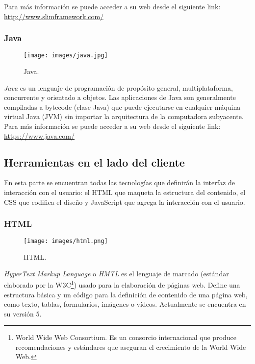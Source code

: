 Para más información se puede acceder a su web desde el siguiente link:\\ \url{http://www.slimframework.com/}

\subsubsection*{Java}
\begin{figure}[H]
	\centering
	\texttt{[image: images/java.jpg]}
	\caption{Java.}
\end{figure}
\textit{Java} es un lenguaje de programación de propósito general, multiplataforma, concurrente y orientado a objetos. Las aplicaciones de Java son generalmente compiladas a bytecode (clase Java) que puede ejecutarse en cualquier máquina virtual Java (JVM) sin importar la arquitectura de la computadora subyacente. \\  

Para más información se puede acceder a su web desde el siguiente link:\\ \url{https://www.java.com/}

\subsection{Herramientas en el lado del cliente}
En esta parte se encuentran todas las tecnologías que definirán la interfaz de interacción con el usuario: el HTML que maqueta la estructura del contenido, el CSS que codifica el diseño y JavaScript que agrega la interacción con el usuario. 
 
\subsubsection*{HTML}
\begin{figure}[H]
	\centering
	\texttt{[image: images/html.png]}
	\caption{HTML.}
\end{figure}

\textit{HyperText Markup Language} o \textit{HMTL} es el lenguaje de marcado (estándar elaborado por la W3C\footnote{World Wide Web Consortium. Es un consorcio internacional que produce recomendaciones y estándares que aseguran el crecimiento de la World Wide Web.}) usado para la elaboración de páginas web. Define una estructura básica y un código para la definición de contenido de una página web, como texto, tablas, formularios, imágenes o vídeos. Actualmente se encuentra en su versión 5.\\  

